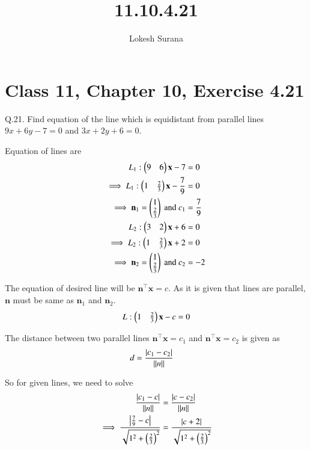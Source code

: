 \documentclass[journal,12pt,twocolumn]{IEEEtran}
\renewcommand{\vec}[1]{\boldsymbol{\mathbf{#1}}}
\begin{document}
\vspace{3cm}
\title{11.10.4.21}
\author{Lokesh Surana}
\maketitle
\section*{Class 11, Chapter 10, Exercise 4.21}

Q.21. Find equation of the line which is equidistant from parallel lines $9{x} + 6{y} - 7 = 0$ and $3{x} + 2{y} + 6 = 0$.

\solution Equation of lines are
\begin{align}
    {L}_1: \myvec{9&6}\vec{x} - 7 &= 0\\
    \implies {L}_1: \myvec{1&\frac{2}{3}}\vec{x} - \frac{7}{9} &= 0\\
    \implies \vec{n}_1 = \myvec{1\\\frac{2}{3}} \text{ and } {c}_1 &= \frac{7}{9}\\
    {L}_2: \myvec{3&2}\vec{x} + 6 &= 0\\
    \implies {L}_2: \myvec{1&\frac{2}{3}}\vec{x} + 2 &= 0\\
    \implies \vec{n}_2 = \myvec{1\\\frac{2}{3}} \text{ and } {c}_2 &= -2
\end{align}

The equation of desired line will be $\vec{n}^{\top}\vec{x} = c$.
As it is given that lines are parallel, $\vec{n}$ must be same as $\vec{n}_1$ and $\vec{n}_2$.
\begin{align}
	{L}: \myvec{1&\frac{2}{3}}\vec{x} - c = 0
\end{align}

The distance between two parallel lines $\vec{n}^{\top}\vec{x} = {c}_1$ and $\vec{n}^{\top}\vec{x} = {c}_2$ is given as
\begin{align}
	{d} &= \frac{\left\vert{c}_1 - {c}_2\right\vert}{\lVert n\rVert}
\end{align}

So for given lines, we need to solve
\begin{align}
	\frac{\left\vert{c}_1 - {c}\right\vert}{\lVert n\rVert} &= \frac{\left\vert{c}-{c}_2\right\vert}{\lVert n\rVert}\\
	\implies \frac{\left\vert\frac{7}{9} - {c}\right\vert}{{\sqrt{1^2 + \left(\frac{2}{3}\right)^2}}} &= \frac{\left\vert{c} + 2\right\vert}{{\sqrt{1^2 + \left(\frac{2}{3}\right)^2}}}
\end{align}
\end{document}

